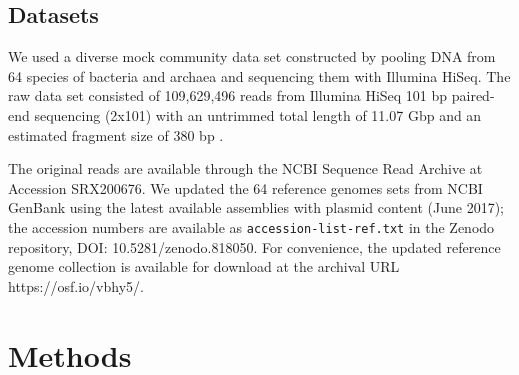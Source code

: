 \documentclass[11pt]{article}
\begin{document}



 

\subsection*{Datasets}

We used a diverse mock community data set constructed by pooling DNA
from 64 species of bacteria and archaea and sequencing them with
Illumina HiSeq.  The raw data set consisted of 109,629,496 reads from
Illumina HiSeq 101 bp paired-end sequencing (2x101) with an untrimmed
total length of 11.07 Gbp and an estimated fragment size of 380 bp
\cite{podar}.
 
The original reads are available through the NCBI Sequence Read
Archive at Accession SRX200676.  We updated the 64 reference genomes
sets from NCBI GenBank using the latest available assemblies with
plasmid content (June 2017); the accession numbers are available as
{\tt accession-list-ref.txt} in the Zenodo repository, DOI: 10.5281/zenodo.818050.
For convenience, the updated reference genome collection is
available for download at the archival URL https://osf.io/vbhy5/.

\section*{Methods}
\end{document}

